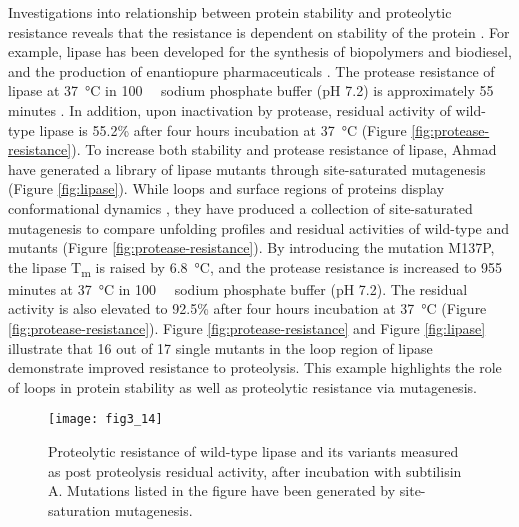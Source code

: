 \begin{refsection}
Investigations into relationship between protein stability and proteolytic
resistance reveals that the resistance is dependent on stability of the protein
\cite{Daniel1982, Parsell1989}. For example,  lipase has
been developed for the synthesis of biopolymers and biodiesel, and the
production of enantiopure pharmaceuticals \cite{Jaeger2002,Ahmad2012}. The
protease resistance of lipase at \SI{37}{\celsius} in \SI{100}{\milli\Molar}
sodium phosphate buffer (pH 7.2) is approximately 55 minutes \cite{Ahmad2012}.
In addition, upon inactivation by protease, residual activity of wild-type
lipase is 55.2\% after four hours incubation at \SI{37}{\celsius}
\cite{Ahmad2012} (Figure \ref{fig:protease-resistance}). To increase both
stability and protease resistance of lipase, Ahmad  have
generated a library of lipase mutants through site-saturated mutagenesis
(Figure \ref{fig:lipase}).  While loops and surface regions of proteins display
conformational dynamics \cite{Kamerzell2008}, they have produced a collection
of site-saturated mutagenesis to compare unfolding profiles and residual
activities of wild-type and mutants (Figure \ref{fig:protease-resistance}). By
introducing the mutation M137P, the lipase T\textsubscript{m} is raised by
\SI{6.8}{\celsius}, and the protease resistance is increased to 955 minutes at
\SI{37}{\celsius} in \SI{100}{\milli\Molar} sodium phosphate buffer (pH 7.2).
The residual activity is also elevated to 92.5\% \cite{Ahmad2012} after four
hours incubation at \SI{37}{\celsius} (Figure \ref{fig:protease-resistance}).
Figure \ref{fig:protease-resistance} and Figure \ref{fig:lipase} illustrate
that 16 out of 17 single mutants in the loop region of lipase demonstrate
improved resistance to proteolysis.  This example highlights the role of loops
in protein stability as well as proteolytic resistance via mutagenesis.
\begin{figure}[htbp] \centering \texttt{[image: fig3\_14]}
    \caption[Proteolytic resistance of wild-type lipase and its variants
        measured as post proteolysis residual activity, after incubation with
        subtilisin A. Mutations listed in the figure have been generated by
        site-saturation mutagenesis. Highlighted is M137P variant that exhibits
        enhanced protease resistance.]{Proteolytic resistance of wild-type
            lipase and its variants measured as post proteolysis residual
            activity, after incubation with subtilisin A. Mutations listed in
            the figure have been generated by site-saturation mutagenesis.
}
\end{figure}
\end{refsection}
